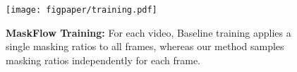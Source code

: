 \begin{figure}
    \centering
    \texttt{[image: figpaper/training.pdf]}
    \caption{\textbf{MaskFlow Training:} For each video, Baseline training applies a single masking ratios to all frames, whereas our method samples masking ratios independently for each frame.}
    \vspace{-10pt}
    \label{fig:training}
\end{figure}

















